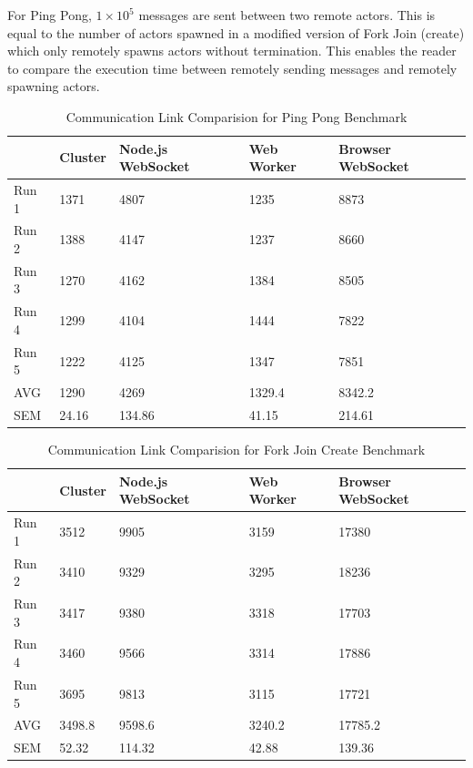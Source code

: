 \documentclass[oneside]{um-fict}
\begin{document}
For Ping Pong, $1\times10^5$ messages are sent between two remote actors. This is equal to the number of actors spawned in a modified version of Fork Join (create) which only remotely spawns actors without termination. This enables the reader to compare the execution time between remotely sending messages and remotely spawning actors.
\begin{table}[H]
    \begin{center}
        \begin{tabular}{|l|llll|}
        \hline
        & Cluster & Node.js WebSocket & Web Worker & Browser WebSocket \\ \hline
        Run 1 & 1371    & 4807              & 1235       & 8873              \\
        Run 2 & 1388    & 4147              & 1237       & 8660              \\
        Run 3 & 1270    & 4162              & 1384       & 8505              \\
        Run 4 & 1299    & 4104              & 1444       & 7822              \\
        Run 5 & 1222    & 4125              & 1347       & 7851              \\ \hline
        AVG   & 1290    & 4269              & 1329.4     & 8342.2            \\
        SEM   & 24.16   & 134.86            & 41.15      & 214.61            \\ \hline
        \end{tabular}
        \caption{Communication Link Comparision for Ping Pong Benchmark}\label{tab:pingpongcomms}
    \end{center}
\end{table}
\begin{table}[H]
    \begin{center}
        \begin{tabular}{|l|llll|}
        \hline
        & Cluster & Node.js WebSocket & Web Worker & Browser WebSocket \\ \hline
        Run 1 & 3512    & 9905              & 3159       & 17380             \\
        Run 2 & 3410    & 9329              & 3295       & 18236             \\
        Run 3 & 3417    & 9380              & 3318       & 17703             \\
        Run 4 & 3460    & 9566              & 3314       & 17886             \\
        Run 5 & 3695    & 9813              & 3115       & 17721             \\ \hline
        AVG   & 3498.8  & 9598.6            & 3240.2     & 17785.2           \\
        SEM   & 52.32   & 114.32            & 42.88      & 139.36            \\ \hline
        \end{tabular}
        \caption{Communication Link Comparision for Fork Join Create Benchmark}\label{tab:fjcreatecomms}
    \end{center}
\end{table}
\end{document}
